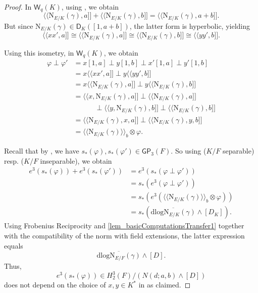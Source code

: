 \documentclass{amsart}
\numberwithin{equation}{section}
\newcommand{\qpf}[1]{\langle\!\langle #1]\!]}
\newcommand{\bipf}[1]{\langle\!\langle #1\rangle\!\rangle_b}
\newcommand{\norm}{\mathrm{N}}
\newcommand{\dlog}{\mathrm{dlog}}
\newcommand{\W}{\mathsf{W}}
\newcommand{\GP}{\mathsf{GP}}
\newcommand{\D}{\mathsf{D}}
\begin{document}
\begin{proof}
    In $\W_q(K)$, using \cite[Lemma 15.1 (1)]{ElmanKarpenkoMerkurjev2008}, we obtain
    \[\qpf{\norm_{E / K}(\gamma), a} + \qpf{\norm_{E / K}(\gamma), b} = \qpf{\norm_{E / K}(\gamma), a + b}.\]
    But since $\norm_{E / K}(\gamma) \in \D_K([1, a+b])$, the latter form is hyperbolic, yielding 
    \[\qpf{xx', a} \cong \qpf{\norm_{E / K}(\gamma), a} \cong \qpf{\norm_{E / K}(\gamma), b} \cong \qpf{yy', b}.\]

    Using this isometry, in $\W_q(K)$, we obtain 
    \begin{align*}
        \varphi \perp \varphi' &= x[1, a] \perp y[1, b] \perp x'[1, a] \perp y'[1, b] \\
        &= x\qpf{xx', a} \perp y\qpf{yy', b}\\
        &= x \qpf{\norm_{E / K}(\gamma), a} \perp y \qpf{\norm_{E / K}(\gamma), b} \\
        &= \qpf{x, \norm_{E / K}(\gamma), a} \perp \qpf{\norm_{E / K}(\gamma), a} \\
        &\quad\quad\quad \perp \qpf{y, \norm_{E / K}(\gamma), b} \perp \qpf{\norm_{E / K}(\gamma), b} \\
        &= \qpf{\norm_{E / K}(\gamma), x, a} \perp \qpf{\norm_{E / K}(\gamma), y, b}\\
        &= \bipf{\norm_{E / K}(\gamma)} \otimes \varphi.
    \end{align*}

    Recall that by , we have $s_\ast(\varphi), s_\ast(\varphi') \in \GP_3(F)$.
    So using \cite[Proposition 3.3]{BarryChapmanLaghribi_DescentBiquaternion} ($K / F$ separable) resp. \cite[Proposition 5.1 (ii)]{AravireLaghribiORyan_TransferInsep} ($K / F$ inseparable), we obtain
    \begin{align} \label{eq_e3TraceSum}
        e^3(s_\ast(\varphi)) + e^3(s_\ast(\varphi')) &= e^3(s_\ast(\varphi \perp \varphi'))\nonumber \\
        &= s_\ast(e^3(\varphi \perp \varphi')) \nonumber\\
        &= s_\ast(e^3(\bipf{\norm_{E / K}(\gamma)} \otimes \varphi)) \nonumber\\
        &= s_\ast\left({\overline{\dlog\norm_{E / K}(\gamma)}} \wedge [D_K] \right).
    \end{align}
    Using Frobenius Reciprocity and  \ref{lem_basicComputationsTransfer1} together with the compatibility of the norm with field extensions, the latter expression equals
    \[\overline{\dlog \norm_{E / F}(\gamma)} \wedge [D].\]
    Thus, 
    \[e^3(s_\ast(\varphi)) \in H_2^3(F) / (N(d; a, b) \wedge [D])\]
    does not depend on the choice of $x, y \in K^\ast$ in  as claimed.
\end{proof}
\end{document}
